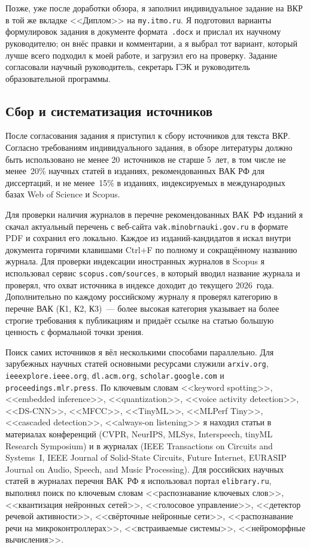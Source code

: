 Позже, уже после доработки обзора, я заполнил индивидуальное задание на
ВКР в той же вкладке <<Диплом>> на \texttt{my.itmo.ru}. Я подготовил
варианты формулировок задания в документе формата~\texttt{.docx} и
прислал их научному руководителю; он внёс правки и комментарии, а я
выбрал тот вариант, который лучше всего подходил к моей работе, и
загрузил его на проверку. Задание согласовали научный руководитель,
секретарь ГЭК и руководитель образовательной программы.

\subsection{Сбор и систематизация источников}

После согласования задания я приступил к сбору источников для
текста ВКР. Согласно требованиям индивидуального задания, в
обзоре литературы должно быть использовано не менее
20~источников не старше 5~лет, в том числе не менее~20\% научных
статей в изданиях, рекомендованных ВАК РФ для диссертаций, и
не менее~15\% в изданиях, индексируемых в международных базах
Web of Science и Scopus.

Для проверки наличия журналов в перечне рекомендованных ВАК~РФ
изданий я скачал актуальный перечень с веб-сайта
\texttt{vak.minobrnauki.gov.ru} в формате PDF и сохранил его
локально. Каждое из изданий-кандидатов я искал внутри документа
горячими клавишами Ctrl+F по полному и сокращённому названию
журнала. Для проверки индексации иностранных журналов в Scopus
я использовал сервис \texttt{scopus.com/sources}, в который
вводил название журнала и проверял, что охват источника в
индексе доходит до текущего 2026~года. Дополнительно по каждому
российскому журналу я проверял категорию в перечне ВАК (К1, К2,
К3)~--- более высокая категория указывает на более строгие
требования к публикациям и придаёт ссылке на статью большую
ценность с формальной точки зрения.

Поиск самих источников я вёл несколькими способами параллельно.
Для зарубежных научных статей основными ресурсами служили
\texttt{arxiv.org}, \texttt{ieeexplore.ieee.org},
\texttt{dl.acm.org}, \texttt{scholar.google.com} и
\texttt{proceedings.mlr.press}. По ключевым словам
<<keyword spotting>>, <<embedded inference>>, <<quantization>>,
<<voice activity detection>>, <<DS-CNN>>, <<MFCC>>,
<<TinyML>>, <<MLPerf Tiny>>, <<cascaded detection>>,
<<always-on listening>> я находил статьи в материалах
конференций (CVPR, NeurIPS, MLSys, Interspeech, tinyML
Research Symposium) и в журналах (IEEE Transactions on Circuits
and Systems~I, IEEE Journal of Solid-State Circuits, Future
Internet, EURASIP Journal on Audio, Speech, and Music
Processing). Для российских научных статей в журналах перечня
ВАК~РФ я использовал портал \texttt{elibrary.ru}, выполнял
поиск по ключевым словам <<распознавание ключевых слов>>,
<<квантизация нейронных сетей>>, <<голосовое управление>>,
<<детектор речевой активности>>, <<свёрточные нейронные сети>>,
<<распознавание речи на микроконтроллерах>>, <<встраиваемые
системы>>, <<нейроморфные вычисления>>.

